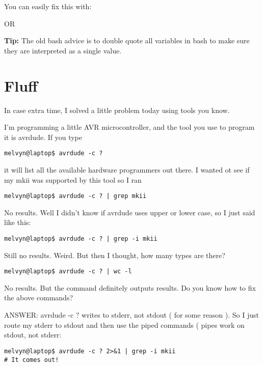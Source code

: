\documentclass[12pt,a4paper]{article}
\begin{document}
You can easily fix this with:



OR




\textbf{Tip:} The old bash advice is to double quote all variables in bash to make sure they are interpreted as a single value.

\section{Fluff}
In case extra time, I solved a little problem today using tools you know.

I'm programming a little AVR microcontroller, and the tool you use to program it
is avrdude. If you type 
\begin{lstlisting}[style=term]
melvyn@laptop$ avrdude -c ?
\end{lstlisting}

it will list all the available hardware programmers out there. I wanted ot see
if my mkii was supported by this tool so I ran

\begin{lstlisting}[style=term]
melvyn@laptop$ avrdude -c ? | grep mkii
\end{lstlisting}

No results. Well I didn't know if avrdude uses upper or lower case, so I just
said like this:

\begin{lstlisting}[style=term]
melvyn@laptop$ avrdude -c ? | grep -i mkii
\end{lstlisting}

Still no results. Weird. But then I thought, how many types are there?

\begin{lstlisting}[style=term]
melvyn@laptop$ avrdude -c ? | wc -l
\end{lstlisting}

No results. But the command definitely outputs results. Do you know how to fix
the above commands?

ANSWER: avrdude -c ?  writes to stderr, not stdout ( for some reason ). So I
just route my stderr to stdout and then use the piped commands ( pipes work on
stdout, not stderr:

\begin{lstlisting}[style=term]
melvyn@laptop$ avrdude -c ? 2>&1 | grep -i mkii
# It comes out!
\end{lstlisting}
\end{document}
